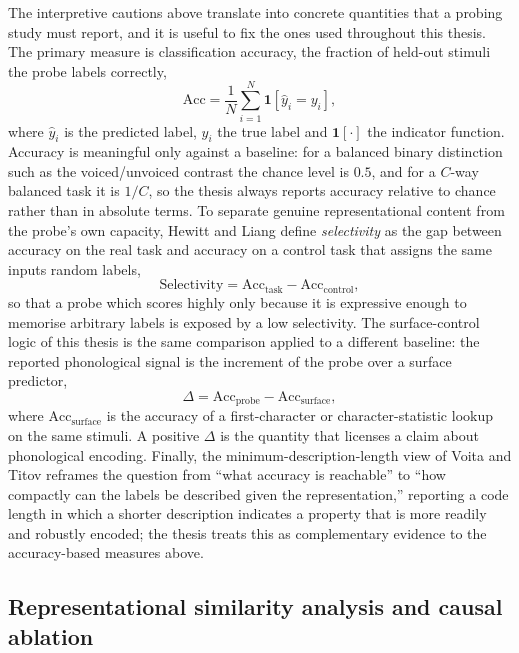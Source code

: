 The interpretive cautions above translate into concrete quantities that a probing study must report, and it is useful to fix the ones used throughout this thesis. The primary measure is classification accuracy, the fraction of held-out stimuli the probe labels correctly,
\begin{equation}
\label{eq:accuracy}
\mathrm{Acc} = \frac{1}{N}\sum_{i=1}^{N} \mathbf{1}\!\left[\hat{y}_i = y_i\right],
\end{equation}
where $\hat{y}_i$ is the predicted label, $y_i$ the true label and $\mathbf{1}[\cdot]$ the indicator function. Accuracy is meaningful only against a baseline: for a balanced binary distinction such as the voiced/unvoiced contrast the chance level is $0.5$, and for a $C$-way balanced task it is $1/C$, so the thesis always reports accuracy relative to chance rather than in absolute terms. To separate genuine representational content from the probe's own capacity, Hewitt and Liang \cite{hewitt2019control} define \emph{selectivity} as the gap between accuracy on the real task and accuracy on a control task that assigns the same inputs random labels,
\begin{equation}
\label{eq:selectivity}
\mathrm{Selectivity} = \mathrm{Acc}_{\mathrm{task}} - \mathrm{Acc}_{\mathrm{control}},
\end{equation}
so that a probe which scores highly only because it is expressive enough to memorise arbitrary labels is exposed by a low selectivity. The surface-control logic of this thesis is the same comparison applied to a different baseline: the reported phonological signal is the increment of the probe over a surface predictor,
\begin{equation}
\label{eq:increment}
\Delta = \mathrm{Acc}_{\mathrm{probe}} - \mathrm{Acc}_{\mathrm{surface}},
\end{equation}
where $\mathrm{Acc}_{\mathrm{surface}}$ is the accuracy of a first-character or character-statistic lookup on the same stimuli. A positive $\Delta$ is the quantity that licenses a claim about phonological encoding. Finally, the minimum-description-length view of Voita and Titov \cite{voita2020mdl} reframes the question from ``what accuracy is reachable'' to ``how compactly can the labels be described given the representation,'' reporting a code length in which a shorter description indicates a property that is more readily and robustly encoded; the thesis treats this as complementary evidence to the accuracy-based measures above.

\subsection{Representational similarity analysis and causal ablation}

